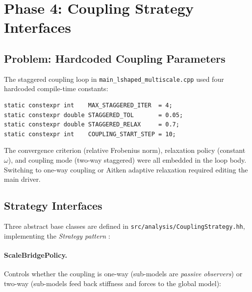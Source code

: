 \section{Phase 4: Coupling Strategy Interfaces}
\label{sec:refactor-coupling-strategy}

\subsection{Problem: Hardcoded Coupling Parameters}

The staggered coupling loop in
\texttt{main\_lshaped\_multiscale.cpp} used four hardcoded
compile-time constants:

\begin{lstlisting}[caption={Hardcoded coupling parameters.}]
static constexpr int    MAX_STAGGERED_ITER  = 4;
static constexpr double STAGGERED_TOL       = 0.05;
static constexpr double STAGGERED_RELAX     = 0.7;
static constexpr int    COUPLING_START_STEP = 10;
\end{lstlisting}

The convergence criterion (relative Frobenius norm), relaxation
policy (constant $\omega$), and coupling mode (two-way staggered)
were all embedded in the loop body.  Switching to one-way coupling
or Aitken adaptive relaxation required editing the main driver.

\subsection{Strategy Interfaces}
\label{sec:refactor-strategy-interfaces}

Three abstract base classes are defined in
\texttt{src/analysis/CouplingStrategy.hh}, implementing the
\emph{Strategy pattern} \cite{GammaDesignPatterns}:

\paragraph{ScaleBridgePolicy.}
Controls whether the coupling is one-way (sub-models are
\emph{passive observers}) or two-way (sub-models feed back
stiffness and forces to the global model):

